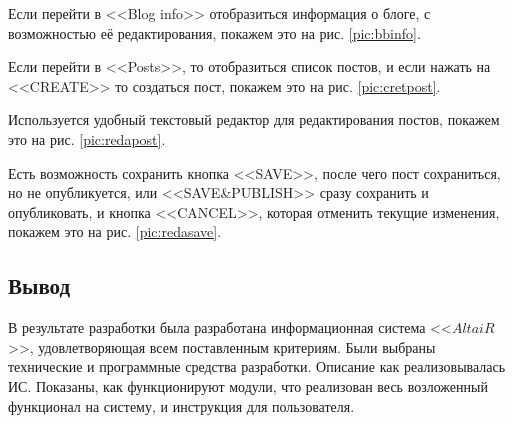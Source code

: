Если перейти в <<Blog info>> отобразиться информация о блоге, с возможностью её редактирования, покажем это на рис. \ref{pic:bbinfo}.


Если перейти в <<Posts>>, то отобразиться список постов, и если нажать на <<CREATE>> то создаться пост, покажем это на рис. \ref{pic:cretpost}.


\pagebreak
Используется удобный текстовый редактор для редактирования постов, покажем это на рис. \ref{pic:redapost}.


Есть возможность сохранить кнопка <<SAVE>>, после чего пост сохраниться, но не опубликуется, или <<SAVE\&PUBLISH>> сразу сохранить и опубликовать, и кнопка <<CANCEL>>, которая отменить текущие изменения, покажем это на рис. \ref{pic:redasave}.


\subsection{Вывод}
В результате разработки была разработана информационная система <<$AltaiR$>>, удовлетворяющая всем поставленным критериям. Были выбраны технические и программные средства разработки. Описание как реализовывалась ИС. Показаны, как функционируют модули, что реализован весь возложенный функционал на систему, и инструкция для пользователя.

\pagebreak